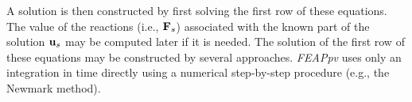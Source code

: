 A solution is then constructed by first solving the first row of these
equations. The value of the reactions (i.e., $\mathbf{F}_s$) associated
with the known part of the solution $\mathbf{u}_s$ may be computed later if it is
needed.  The solution of the first row of these equations may be
constructed by several approaches.  \textsl{FEAPpv} uses only an integration in
time directly using a numerical step-by-step procedure (e.g., the Newmark
method).

